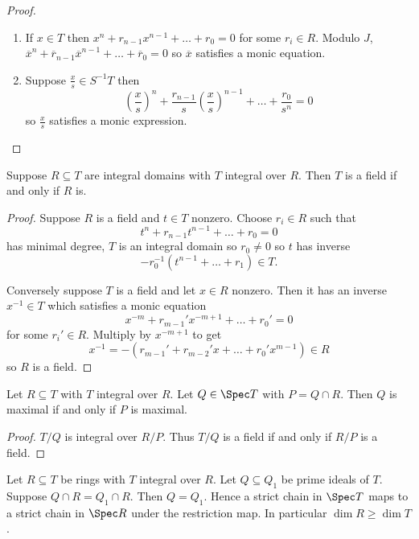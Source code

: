 \documentclass[a4paper]{article}
\begin{document}
\begin{proof}\leavevmode
  \begin{enumerate}
  \item If \(x \in T\) then \(x^n + r_{n - 1}x^{n - 1} + \dots + r_0 = 0\) for some \(r_i \in R\). Modulo \(J\), \(\overline x^n + \overline r_{n - 1} \overline x^{n - 1} + \dots + \overline r_0 = 0\) so \(\overline x\) satisfies a monic equation.
  \item Suppose \(\frac{x}{s} \in S^{-1}T\) then
    \[
      \left( \frac{x}{s} \right)^n + \frac{r_{n - 1}}{s} \left( \frac{x}{s} \right)^{n - 1} + \dots + \frac{r_0}{s^n} = 0
    \]
    so \(\frac{x}{s}\) satisfies a monic expression.
  \end{enumerate}
\end{proof}

\begin{lemma}
  Suppose \(R \subseteq T\) are integral domains with \(T\) integral over \(R\). Then \(T\) is a field if and only if \(R\) is.
\end{lemma}

\begin{proof}
  Suppose \(R\) is a field and \(t \in T\) nonzero. Choose \(r_i \in R\) such that
  \[
    t^n + r_{n - 1}t^{n - 1} + \dots + r_0 = 0
  \]
  has minimal degree, \(T\) is an integral domain so \(r_0 \neq 0\) so \(t\) has inverse
  \[
    -r_0^{-1}(t^{n - 1} + \dots + r_1) \in T.
  \]

  Conversely suppose \(T\) is a field and let \(x \in R\) nonzero. Then it has an inverse \(x^{-1} \in T\) which satisfies a monic equation
  \[
    x^{-m} + r_{m - 1}' x^{-m + 1} + \dots + r_0' = 0
  \]
  for some \(r_i' \in R\). Multiply by \(x^{-m + 1}\) to get
  \[
    x^{-1} = -(r_{m - 1}' + r_{m - 2}' x + \dots + r_0' x^{m - 1}) \in R
  \]
  so \(R\) is a field.
\end{proof}

\begin{corollary}
  Let \(R \subseteq T\) with \(T\) integral over \(R\). Let \(Q \in \Spec T\) with \(P = Q \cap R\). Then \(Q\) is maximal if and only if \(P\) is maximal.
\end{corollary}

\begin{proof}
  \(T/Q\) is integral over \(R/P\). Thus \(T/Q\) is a field if and only if \(R/P\) is a field.
\end{proof}

\begin{theorem}
  Let \(R \subseteq T\) be rings with \(T\) integral over \(R\). Let \(Q \subseteq Q_1\) be prime ideals of \(T\). Suppose \(Q \cap R = Q_1 \cap R\). Then \(Q = Q_1\). Hence a strict chain in \(\Spec T\) maps to a strict chain in \(\Spec R\) under the restriction map. In particular \(\dim R \geq \dim T\).
\end{theorem}
\end{document}
